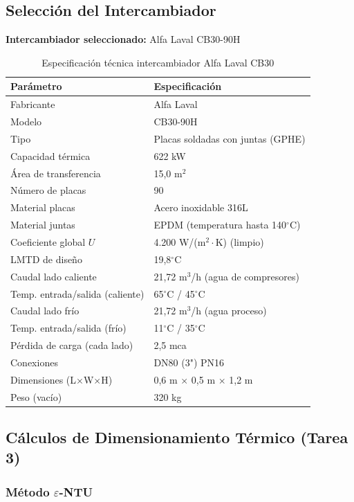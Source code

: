 \documentclass[12pt,a4paper]{article}
\begin{document}
\subsection{Selección del Intercambiador}

\textbf{Intercambiador seleccionado:} Alfa Laval CB30-90H

\begin{table}[h]
\centering
\caption{Especificación técnica intercambiador Alfa Laval CB30}
\small
\begin{tabular}{ll}
\toprule
\textbf{Parámetro} & \textbf{Especificación} \\
\midrule
Fabricante & Alfa Laval \\
Modelo & CB30-90H \\
Tipo & Placas soldadas con juntas (GPHE) \\
Capacidad térmica & 622 kW \\
Área de transferencia & 15,0 m$^2$ \\
Número de placas & 90 \\
Material placas & Acero inoxidable 316L \\
Material juntas & EPDM (temperatura hasta 140$^\circ$C) \\
Coeficiente global $U$ & 4.200 W/(m$^2\cdot$K) (limpio) \\
LMTD de diseño & 19,8$^\circ$C \\
Caudal lado caliente & 21,72 m$^3$/h (agua de compresores) \\
Temp. entrada/salida (caliente) & 65$^\circ$C / 45$^\circ$C \\
Caudal lado frío & 21,72 m$^3$/h (agua proceso) \\
Temp. entrada/salida (frío) & 11$^\circ$C / 35$^\circ$C \\
Pérdida de carga (cada lado) & 2,5 mca \\
Conexiones & DN80 (3") PN16 \\
Dimensiones (L$\times$W$\times$H) & 0,6 m $\times$ 0,5 m $\times$ 1,2 m \\
Peso (vacío) & 320 kg \\
\bottomrule
\end{tabular}
\end{table}

\subsection{Cálculos de Dimensionamiento Térmico (Tarea 3)}

\subsubsection{Método $\varepsilon$-NTU}
\end{document}
